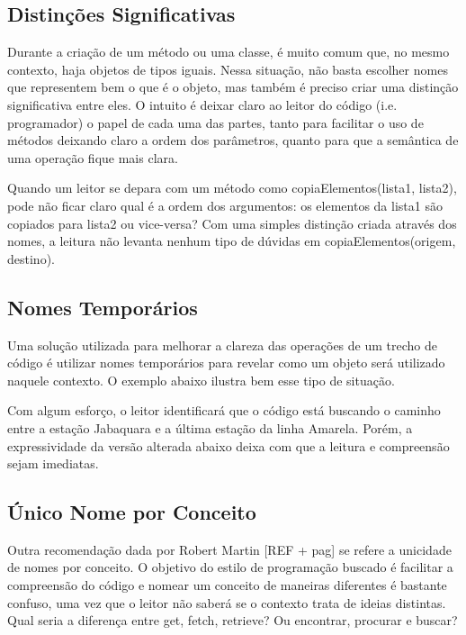 \subsection{Distinções Significativas}
Durante a criação de um método ou uma classe, é muito comum que, no mesmo contexto, haja  objetos de tipos iguais. Nessa situação, não basta escolher nomes que representem bem o que é o objeto, mas também é preciso criar uma distinção significativa entre eles. O intuito é deixar claro ao leitor do código  (i.e. programador) o papel de cada uma das partes, tanto para facilitar o uso de métodos deixando claro a ordem dos parâmetros, quanto para que a semântica de uma operação fique mais clara.
	
Quando um leitor se depara com um método como copiaElementos(lista1, lista2), pode não ficar claro qual é a ordem dos argumentos: os elementos da lista1 são copiados para lista2 ou vice-versa? Com uma simples distinção criada através dos nomes, a leitura não levanta nenhum tipo de dúvidas em copiaElementos(origem, destino).

\subsection{Nomes Temporários}
Uma solução utilizada para melhorar a clareza das operações de um trecho de código é utilizar nomes temporários para revelar como um objeto será utilizado naquele contexto. O exemplo abaixo ilustra bem esse tipo de situação.



Com algum esforço, o leitor identificará que o código está buscando o caminho entre a estação Jabaquara e a última estação da linha Amarela. Porém, a expressividade da versão alterada abaixo deixa com que a leitura e compreensão sejam imediatas.




\subsection{Único Nome por Conceito}
Outra recomendação dada por Robert Martin [REF + pag] se refere a unicidade de nomes por conceito. O objetivo do estilo de programação buscado é facilitar a compreensão do código e nomear um conceito de maneiras diferentes é bastante confuso, uma vez que o leitor não saberá se o contexto trata de ideias distintas. Qual seria a diferença entre get, fetch, retrieve? Ou encontrar, procurar e buscar?
	
